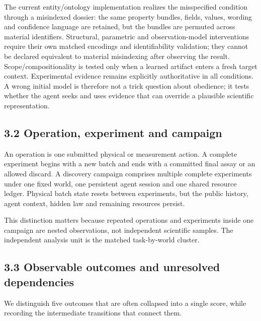 \documentclass[10pt,twocolumn]{article}
\begin{document}
The current entity/ontology implementation realizes the misspecified
condition through a misindexed dossier: the same property bundles,
fields, values, wording and confidence language are retained, but the
bundles are permuted across material identifiers. Structural, parametric
and observation-model interventions require their own matched encodings
and identifiability validation; they cannot be declared equivalent to
material misindexing after observing the result. Scope/compositionality
is tested only when a learned artifact enters a fresh target context.
Experimental evidence remains explicitly authoritative in all
conditions. A wrong initial model is therefore not a trick question
about obedience; it tests whether the agent seeks and uses evidence that
can override a plausible scientific representation.

\subsection{3.2 Operation, experiment and
campaign}\label{operation-experiment-and-campaign}

An operation is one submitted physical or measurement action. A complete
experiment begins with a new batch and ends with a committed final assay
or an allowed discard. A discovery campaign comprises multiple complete
experiments under one fixed world, one persistent agent session and one
shared resource ledger. Physical batch state resets between experiments,
but the public history, agent context, hidden law and remaining
resources persist.

This distinction matters because repeated operations and experiments
inside one campaign are nested observations, not independent scientific
samples. The independent analysis unit is the matched task-by-world
cluster.

\subsection{3.3 Observable outcomes and unresolved
dependencies}\label{observable-outcomes-and-unresolved-dependencies}

We distinguish five outcomes that are often collapsed into a single
score, while recording the intermediate transitions that connect them.
\end{document}
